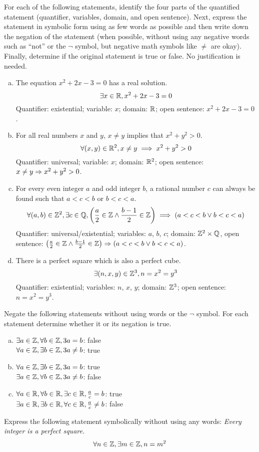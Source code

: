 \documentclass{agony}
\begin{document}
\question For each of the following statements, identify the four parts of the quantified statement
(quantifier, variables, domain, and open sentence).
Next, express the statement in symbolic form using as few words as possible and then write down the negation of the statement
(when possible, without using any negative words such as ``not'' or the $\lnot$ symbol, but negative math symbols like $\neq$ are okay).
Finally, determine if the original statement is true or false.
No justification is needed.
\begin{enumerate}[(a)]
  \item The equation $x^2+2x-3=0$ has a real solution.
        \[ \exists x\in\mathbb{R}, x^2+2x-3 = 0 \]
        Quantifier: existential;
        variable: $x$;
        domain: $\mathbb{R}$;
        open sentence: $x^2+2x-3=0$.
  \item For all real numbers $x$ and $y$, $x \neq y$ implies that $x^2+y^2 > 0$.
        \[ \forall (x,y)\in\mathbb{R}^2, x \neq y \implies x^2+y^2>0 \]
        Quantifier: universal;
        variable: $x$;
        domain: $\mathbb{R}^2$;
        open sentence: $x \neq y \Rightarrow x^2+y^2>0$.
  \item For every even integer $a$ and odd integer $b$, a rational number $c$ can always be found such that $a<c<b$ or $b<c<a$.
        \[ \forall (a,b)\in\mathbb{Z}^2, \exists c\in\mathbb{Q}, \left(\frac{a}{2}\in\mathbb{Z} \land \frac{b-1}{2}\in\mathbb{Z}\right) \implies (a<c<b \lor b<c<a) \]
        Quantifier: universal/existential;
        variables: $a$, $b$, $c$;
        domain: $\mathbb{Z}^2\times\mathbb{Q}$,
        open sentence: $\left(\frac{a}{2}\in\mathbb{Z} \land \frac{b-1}{2}\in\mathbb{Z}\right) \Rightarrow (a<c<b \lor b<c<a)$.
  \item There is a perfect square which is also a perfect cube.
        \[ \exists (n,x,y)\in\mathbb{Z}^3, n=x^2=y^3 \]
        Quantifier: existential; variables: $n$, $x$, $y$; domain: $\mathbb{Z}^3$; open sentence: $n=x^2=y^3$.
\end{enumerate}


\question Negate the following statements without using words or the $\lnot$ symbol.
For each statement determine whether it or its negation is true.
\begin{enumerate}[(a)]
  \item $\exists a \in \mathbb{Z}, \forall b \in \mathbb{Z}, 3a=b$: false \\
        $\forall a \in \mathbb{Z}, \exists b \in \mathbb{Z}, 3a \neq b$: true
  \item $\forall a \in \mathbb{Z}, \exists b \in \mathbb{Z}, 3a=b$: true \\
        $\exists a \in \mathbb{Z}, \forall b \in \mathbb{Z}, 3a \neq b$: false
  \item $\forall a \in \mathbb{R}, \forall b \in \mathbb{R}, \exists c \in \mathbb{R}, \frac{a}{c}=b$: true \\
        $\exists a \in \mathbb{R}, \exists b \in \mathbb{R}, \forall c \in \mathbb{R}, \frac{a}{c} \neq b$: false
\end{enumerate}


\question Express the following statement symbolically without using any words:
\emph{Every integer is a perfect square.}
\[ \forall n\in\mathbb{Z}, \exists m\in\mathbb{Z}, n = m^2 \]
\end{document}
